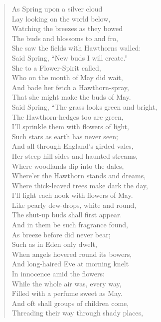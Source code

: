\documentclass[11pt,twoside]{article}
\begin{document}
\begin{verse}
As Spring upon a silver cloud\\
\quad Lay looking on the world below,\\
Watching the breezes as they bowed\\
\quad The buds and blossoms to and fro,\\
She saw the fields with Hawthorns walled:\\
\quad Said Spring, “New buds I will create.”\\
She to a Flower-Spirit called,\\
\quad Who on the month of May did wait,\\
And bade her fetch a Hawthorn-spray,\\
That she might make the buds of May.\\
Said Spring, “The grass looks green and bright,\\
\quad The Hawthorn-hedges too are green,\\
I’ll sprinkle them with flowers of light,\\
\quad Such stars as earth has never seen;\\
And all through England’s girded vales,\\
\quad Her steep hill-sides and haunted streams,\\
Where woodlands dip into the dales,\\
\quad Where’er the Hawthorn stands and dreams,\\
Where thick-leaved trees make dark the day,\\
I’ll light each nook with flowers of May.\\
Like pearly dew-drops, white and round,\\
\quad The shut-up buds shall first appear.\\
And in them be such fragrance found,\\
\quad As breeze before did never bear;\\
Such as in Eden only dwelt,\\
\quad When angels hovered round its bowers,\\
And long-haired Eve at morning knelt\\
\quad In innocence amid the flowers:\\
While the whole air was, every way,\\
Filled with a perfume sweet as May.\\
And oft shall groups of children come,\\
\quad Threading their way through shady places,\\

\end{verse}
\end{document}

